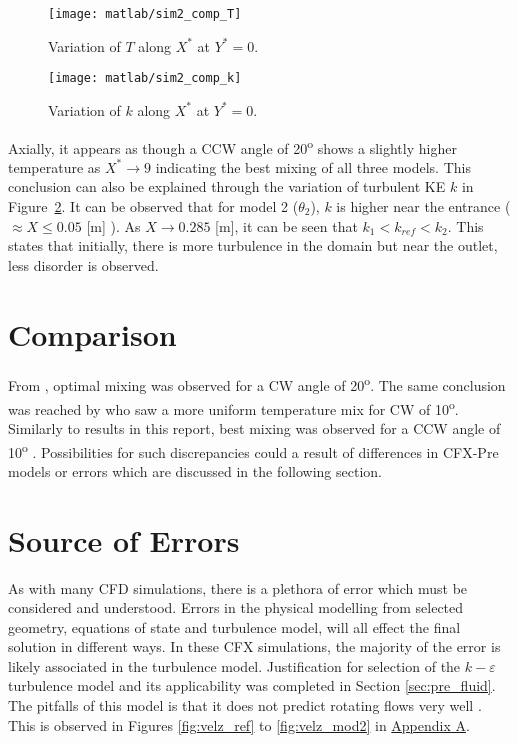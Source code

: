 \begin{figure}[H]
	\centering
	\texttt{[image: matlab/sim2\_comp\_T]}
	\caption{Variation of $T$ along $X^*$ at $Y^*=0$.}
	\label{fig:sim2_comp_T}
\end{figure}

\begin{figure}[H]
	\centering
	\texttt{[image: matlab/sim2\_comp\_k]}
	\caption{Variation of $k$ along $X^*$ at $Y^*=0$.}
	\label{fig:sim2_comp_k}
\end{figure}

Axially, it appears as though a CCW angle of 20\textsuperscript{o} shows a slightly higher temperature as $X^* \rightarrow 9$ indicating the best mixing of all three models. This conclusion can also be explained through the variation of turbulent KE $k$ in Figure~\ref{fig:sim2_comp_k}. It can be observed that for model 2 ($\theta_2$), $k$ is higher near the entrance ($\approx X\leq 0.05$ [m] ). As $X\rightarrow 0.285$ [m], it can be seen that $k_1 < k_{ref} < k_2$. This states that initially, there is more turbulence in the domain but near the outlet, less disorder is observed.
\section{Comparison}
\label{sec:comp}

From \cite{mobin}, optimal mixing was observed for a CW angle of 20\textsuperscript{o}. The same conclusion was reached by \cite{curtis} who saw a more uniform temperature mix for CW of 10\textsuperscript{o}. Similarly to results in this report, best mixing was observed for a CCW angle of 10\textsuperscript{o} \cite{tolu}. Possibilities for such discrepancies could a result of differences in CFX-Pre models or errors which are discussed in the following section.
 
\section{Source of Errors}
\label{sec:err}

As with many CFD simulations, there is a plethora of error which must be considered and understood. Errors in the physical modelling from selected geometry, equations of state and turbulence model, will all effect the final solution in different ways. In these CFX simulations, the majority of the error is likely associated in the turbulence model. Justification for selection of the $k-\varepsilon$ turbulence model and its applicability was completed in Section \ref{sec:pre_fluid}. The pitfalls of this model is that it does not predict rotating flows very well \cite{cfdbook}. This is observed in Figures \ref{fig:velz_ref} to \ref{fig:velz_mod2} in \hyperlink{appendixa}{Appendix A}.\\

